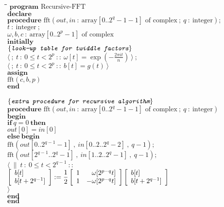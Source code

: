\begin{tabbing}
	\quad\=\quad\=\quad\=\kill
	$\mathbf{program} \textrm{ Recursive-FFT}$\\
	$\mathbf{declare}$\\
		\>$\mathbf{procedure} \textrm{ fft}(\mathit{out},\mathit{in}\ :\ \mathrm{array}[0..2^{q}-1-1] \textrm{ of complex}\ ;\ q\ :\ \mathrm{integer});$ \\
		\>$t\ :\ \textrm{integer}\ ;$\\
		\>$\omega,b,c\ :\ \mathrm{array}[0..2^{p}-1] \textrm{ of complex}$\\
	$\mathbf{initially}$\\
		\>$\color{MidnightBlue}\curlb{\textit{\ttfamily look-up table for twiddle factors}}$\\
		\>$\langle \ ;\ t\ :\ 0\leq t<2^p\ ::\ \omega[t] = \exp(-\frac{2\pi it}{n})\ \rangle\ ;$\\
		\>$\langle \ ;\ t\ :\ 0\leq t<2^p\ ::\ b[t] = g(t)\ \rangle$\\
	$\mathbf{assign}$\\
		\>$\mathrm{fft}(c,b,p)$\\
	$\mathbf{end}$\\
	\\
	$\color{MidnightBlue}\curlb{\textit{\ttfamily extra procedure for recursive algorithm}}$\\
	$\mathbf{procedure} \textrm{ fft}(\mathit{out},\mathit{in}\ :\ \mathrm{array}[0..2^{q}-1-1] \textrm{ of complex}\ ;\ q\ :\ \mathrm{integer})$ \\
	$\mathbf{begin}$\\
		\>$\mathbf{if}\ q=0\ \mathbf{then}$\\
			\>\>$\mathit{out}[0] = \mathit{in}[0]$\\
		\>$\mathbf{else}\ \mathbf{begin}$\\
			\>\>$\mathrm{fft}(\mathit{out}[0..2^{q-1}-1]\ ,\ \mathit{in}[0..2..2^{q}-2]\ ,\ q-1);$\\
			\>\>$\mathrm{fft}(\mathit{out}[2^{q-1}..2^q-1]\ ,\ \mathit{in}[1..2..2^{q}-1]\ ,\ q-1);$\\
			\>\>$\langle \ \|\ t\ :\ 0\leq t<2^{q-1}\ ::$\\
				\>\>\>$\boxb{ \begin{array}{l} b[t] \\ b[t+2^{q-1}] \end{array} } := \dfrac{1}{2} \boxb{ \begin{array}{lr} 1 & \omega[2^{p-q}t] \\ 1 & -\omega[2^{p-q}t] \end{array} }\boxb{ \begin{array}{l} b[t] \\ b[t+2^{q-1}] \end{array} }$\\
			\>\>$\rangle$\\
		\>$\mathbf{end}$\\
	$\mathbf{end}$\\
\end{tabbing}


